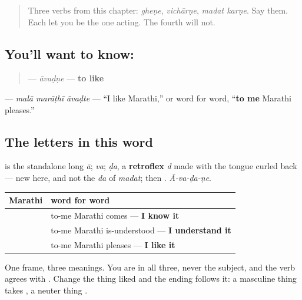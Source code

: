 \label{lesson:MR-C09-avadne}



\begin{quote}
Three verbs from this chapter: \emph{gheṇe}, \emph{vichārṇe}, \emph{madat karṇe}. Say them. Each let you be the one acting. The fourth will not.
\end{quote}

\subsection*{You'll want to know: }
\begin{quote}
\textbf{} — \emph{āvaḍṇe} — \textbf{to like}
\end{quote}

\textbf{  } — \emph{malā marāṭhī āvaḍte} — \textquotedblleft{}I like Marathi,\textquotedblright{} or word for word, \textquotedblleft{}\textbf{to me} Marathi pleases.\textquotedblright{}

\subsection*{The letters in this word}
\textbf{} is the standalone long \emph{ā}; \textbf{} \emph{va}; \textbf{} \emph{ḍa}, a \textbf{retroflex} \emph{d} made with the tongue curled back — new here, and not the \textbf{} \emph{da} of \emph{madat}; then \textbf{}. \emph{Ā-va-ḍa-ṇe}.

\begin{grammarlens}[title={Grammar Lens: the third sentence built this way}]
\noindent
\begin{tabularx}{\linewidth}{@{}>{\raggedright\arraybackslash}X>{\raggedright\arraybackslash}X@{}}
\toprule
\textbf{Marathi} & \textbf{word for word} \\
\midrule
\mr{मला} \mr{मराठी} \mr{येते} & to-me Marathi comes — \textbf{I know it} \\
\mr{मला} \mr{मराठी} \mr{समजते} & to-me Marathi is-understood — \textbf{I understand it} \\
\mr{मला} \mr{मराठी} \mr{आवडते} & to-me Marathi pleases — \textbf{I like it} \\
\bottomrule
\end{tabularx}

One frame, three meanings. You are \textbf{} in all three, never the subject, and the verb agrees with \textbf{}. Change the thing liked and the ending follows it: a masculine thing takes \textbf{}, a neuter thing \textbf{}.
\end{grammarlens}


